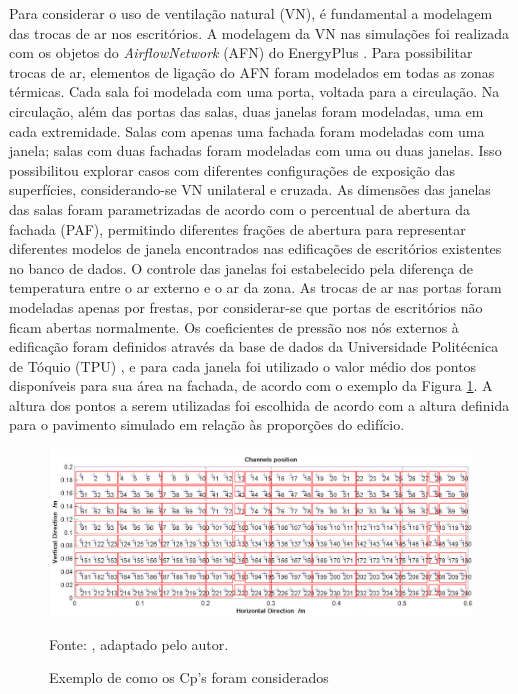 \documentclass[brazil,hardcopy,openany,a5paper]{ufscthesis}
\begin{document}
		Para considerar o uso de ventilação natural (VN), é fundamental a modelagem das trocas de ar nos escritórios. A modelagem da VN nas simulações foi realizada com os objetos do \textit{AirflowNetwork} (AFN) do EnergyPlus \cite{EnergyPlus2018}.
		Para possibilitar trocas de ar, elementos de ligação do AFN foram modelados em todas as zonas térmicas. 
		Cada sala foi modelada com uma porta, voltada para a circulação.
		Na circulação, além das portas das salas, duas janelas foram modeladas, uma em cada extremidade. 
		Salas com apenas uma fachada foram modeladas com uma janela; salas com duas fachadas foram modeladas com uma ou duas janelas. Isso possibilitou explorar casos com diferentes configurações de exposição das superfícies, considerando-se VN unilateral e cruzada.		
		As dimensões das janelas das salas foram parametrizadas de acordo com o percentual de abertura da fachada (PAF), permitindo diferentes frações de abertura para representar diferentes modelos de janela encontrados nas edificações de escritórios existentes no banco de dados.
		O controle das janelas foi estabelecido pela diferença de temperatura entre o ar externo e o ar da zona.
		As trocas de ar nas portas foram modeladas apenas por frestas, por considerar-se que portas de escritórios não ficam abertas normalmente.  %
		Os coeficientes de pressão nos nós externos à edificação foram definidos através da base de dados da Universidade Politécnica de Tóquio (TPU) \cite{TPU2018}, e para cada janela foi utilizado o valor médio dos pontos disponíveis para sua área na fachada, de acordo com o exemplo da Figura \ref{fig:tpuwindows}. A altura dos pontos a serem utilizadas foi escolhida de acordo com a altura definida para o pavimento simulado em relação às proporções do edifício.
		
		\begin{figure}[h]
			\centering
			\caption{Exemplo de como os Cp’s foram considerados}
			\includegraphics[width=1\linewidth]{img/tpu_windows.png}
			\label{fig:tpuwindows}
			\begin{flushleft}
				Fonte:  \cite{TPU2018}, adaptado pelo autor.
			\end{flushleft}
		\end{figure}
		
\end{document}

